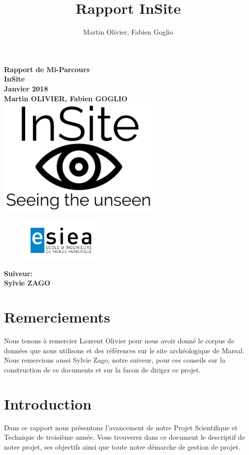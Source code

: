 \documentclass[a4paper, 12pt, titlepage, oneside, french]{article}
\author{Martin Olivier, Fabien Goglio}
\title{Rapport InSite}
\begin{document}
\begin{titlepage}
	\centering
		\vfill
		    {\bfseries\Large
			Rapport de Mi-Parcours\\
			InSite\\
			Janvier 2018\\
			\vskip2cm
			Martin OLIVIER, Fabien GOGLIO\\
		    }    
		\vfill
		\includegraphics[width=8cm]{Logo_Preview.png}
		\begin{figure}[b]
			\includegraphics[width=4cm]{Logo-ESIEA.jpg}

		\end{figure}
		\vfill
		\hfill {\bfseries\Large
		 Suiveur:\\
		 \hfill Sylvie ZAGO}
\end{titlepage}

\newpage
	\tableofcontents
\newpage
\cleardoublepage
\setcounter{page}{1} %
\section{Remerciements}
	Nous tenons à remercier Laurent Olivier pour nous avoir donné le corpus de données que nous utilisons et des références sur le site archéologique de Marsal.
	Nous remercions aussi Sylvie Zago, notre suiveur, pour ces conseils sur la construction de ce documents et sur la facon de diriger ce projet.
	\newpage
\section{Introduction}
	Dans ce rapport nous présentons l'avancement de notre Projet Scientifique et Technique de troisième année.
	Vous trouverez dans ce document le descriptif de notre projet, ses objectifs ainsi que toute notre démarche de gestion de projet.
\end{document}
